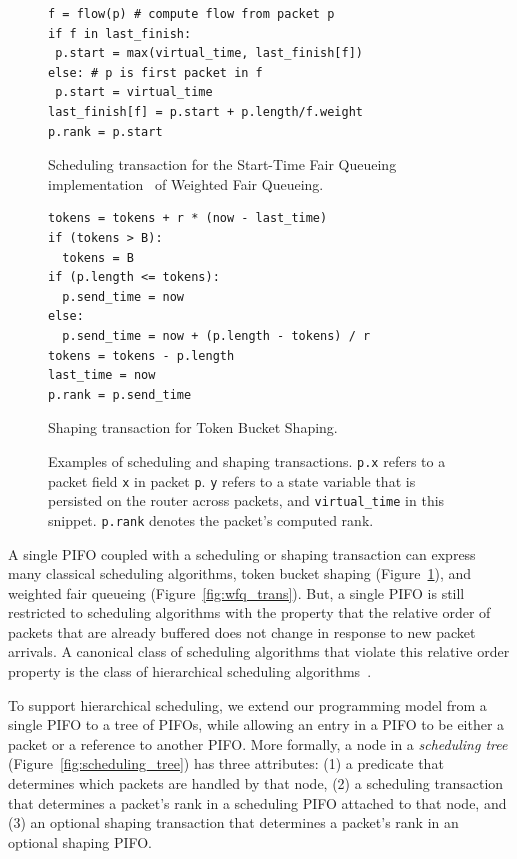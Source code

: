 \begin{figure}
\begin{minipage}[!h]{0.48\textwidth}
\vspace{0.4in}
\begin{lstlisting}[style=customcscriptsize]
f = flow(p) # compute flow from packet p
if f in last_finish:
 p.start = max(virtual_time, last_finish[f])
else: # p is first packet in f
 p.start = virtual_time
last_finish[f] = p.start + p.length/f.weight
p.rank = p.start
\end{lstlisting}
\caption{Scheduling transaction for the Start-Time Fair Queueing implementation~\cite{stfq} of Weighted Fair Queueing.}
\label{fig:wfq_trans}
\hfill
\end{minipage}
\begin{minipage}[!h]{0.48\textwidth}
\begin{lstlisting}[style=customcscriptsize]
tokens = tokens + r * (now - last_time)
if (tokens > B):
  tokens = B
if (p.length <= tokens):
  p.send_time = now
else:
  p.send_time = now + (p.length - tokens) / r
tokens = tokens - p.length
last_time = now
p.rank = p.send_time
\end{lstlisting}
\caption{Shaping transaction for Token Bucket Shaping.}
\label{fig:tbf_trans}
\end{minipage}
\caption{Examples of scheduling and shaping transactions. {\tt p.x} refers to a packet field {\tt x} in packet {\tt p}.  {\tt y} refers to a state variable
that is persisted on the router across packets, 
and {\tt virtual\_time} in this snippet. {\tt p.rank} denotes the
packet's computed rank.}
\end{figure}

A single PIFO coupled with a scheduling or shaping transaction can express many
classical scheduling algorithms, \eg token bucket shaping
(Figure~\ref{fig:tbf_trans}), and weighted fair queueing
(Figure~\ref{fig:wfq_trans}). But, a single PIFO is still restricted to
scheduling algorithms with the property that the relative order of packets that
are already buffered does not change in response to new packet arrivals. A
canonical class of scheduling algorithms that violate this relative order
property is the class of hierarchical scheduling algorithms~\cite{hpfq}.
 
To support hierarchical scheduling, we extend our programming model from a
single PIFO to a tree of PIFOs, while allowing an entry in a PIFO to be either
a packet or a reference to another PIFO. More formally, a node in a {\em scheduling
tree} (Figure~\ref{fig:scheduling_tree}) has three attributes: (1) a predicate
that determines which packets are handled by that node, (2) a scheduling
transaction that determines a packet's rank in a scheduling PIFO attached to
that node, and (3) an optional shaping transaction that determines a packet's
rank in an optional shaping PIFO.

